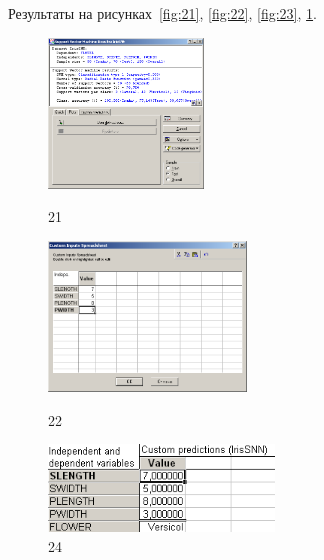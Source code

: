 Результаты на рисунках~\ref{fig:21}, \ref{fig:22}, \ref{fig:23}, \ref{fig:24}.

\begin{figure}[!h]
  \centering

  \begin{minipage}{0.32\textwidth}
    \centering

    \includegraphics[height=4cm]
    {inc/ex_21.PNG}

    \caption{21}

    \label{fig:21}
  \end{minipage}
  \begin{minipage}{0.32\textwidth}
    \centering

    \includegraphics[height=4cm]
    {inc/ex_22.PNG}

    \caption{22}

    \label{fig:22}
  \end{minipage}
  \begin{minipage}{0.32\textwidth}
    \centering

    \includegraphics[width=6cm]
    {inc/ex_24.PNG}

    \caption{24}

    \label{fig:24}
  \end{minipage}
\end{figure}
